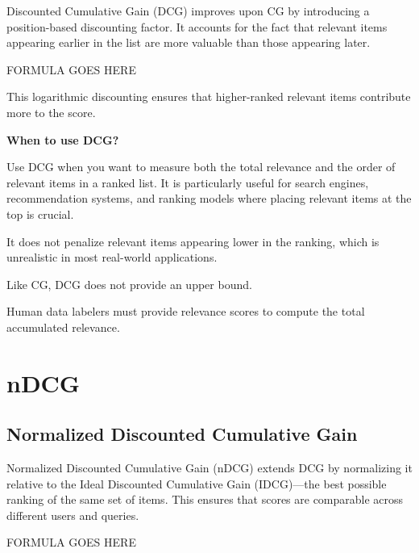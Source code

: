 Discounted Cumulative Gain (DCG) improves upon CG by introducing a position-based discounting factor.
It accounts for the fact that relevant items appearing earlier in the list are more valuable than those appearing later.

\begin{center}
    FORMULA GOES HERE
\end{center}

This logarithmic discounting ensures that higher-ranked relevant items contribute more to the score.

\textbf{When to use DCG?}

Use DCG when you want to measure both the total relevance and the order of relevant items in a ranked list. It is particularly
useful for search engines, recommendation systems, and ranking models where placing relevant items at the top is crucial.

{
    \item It does not penalize relevant items appearing lower in the ranking, which is
    unrealistic in most real-world applications.
    \item Like CG, DCG does not provide an upper bound.
    \item Human data labelers must provide relevance scores to compute the total accumulated relevance.
}

\clearpage
\thispagestyle{rankingstyle}
\section{nDCG}
\subsection{Normalized Discounted Cumulative Gain}

Normalized Discounted Cumulative Gain (nDCG) extends DCG by normalizing it relative to the Ideal Discounted Cumulative Gain
(IDCG)—the best possible ranking of the same set of items. This ensures that scores are comparable across different users
and queries.

\begin{center}
    FORMULA GOES HERE
\end{center}

